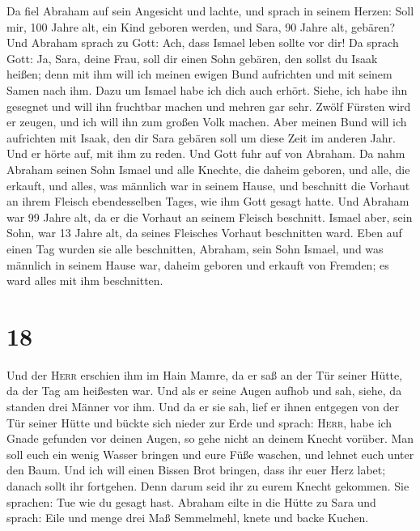  Da fiel Abraham auf sein Angesicht und lachte, und
sprach in seinem Herzen: Soll mir, 100 Jahre alt, ein Kind geboren
werden, und Sara, 90 Jahre alt, gebären?  Und Abraham
sprach zu Gott: Ach, dass Ismael leben sollte vor dir! 
Da sprach Gott: Ja, Sara, deine Frau, soll dir einen Sohn gebären, den
sollst du Isaak heißen; denn mit ihm will ich meinen ewigen Bund
aufrichten und mit seinem Samen nach ihm.  Dazu um Ismael
habe ich dich auch erhört. Siehe, ich habe ihn gesegnet und will ihn
fruchtbar machen und mehren gar sehr. Zwölf Fürsten wird er zeugen, und
ich will ihn zum großen Volk machen.  Aber meinen Bund
will ich aufrichten mit Isaak, den dir Sara gebären soll um diese Zeit
im anderen Jahr.  Und er hörte auf, mit ihm zu reden. Und
Gott fuhr auf von Abraham.  Da nahm Abraham seinen Sohn
Ismael und alle Knechte, die daheim geboren, und alle, die erkauft, und
alles, was männlich war in seinem Hause, und beschnitt die Vorhaut an
ihrem Fleisch ebendesselben Tages, wie ihm Gott gesagt hatte.
 Und Abraham war 99 Jahre alt, da er die Vorhaut an
seinem Fleisch beschnitt.  Ismael aber, sein Sohn, war 13
Jahre alt, da seines Fleisches Vorhaut beschnitten ward. 
Eben auf einen Tag wurden sie alle beschnitten, Abraham, sein Sohn
Ismael,  und was männlich in seinem Hause war, daheim
geboren und erkauft von Fremden; es ward alles mit ihm beschnitten.

\hypertarget{section-17}{%
\section{18}\label{section-17}}

 Und der \textsc{Herr} erschien ihm im Hain Mamre, da er
saß an der Tür seiner Hütte, da der Tag am heißesten war. 
Und als er seine Augen aufhob und sah, siehe, da standen drei Männer vor
ihm. Und da er sie sah, lief er ihnen entgegen von der Tür seiner Hütte
und bückte sich nieder zur Erde  und sprach:
\textsc{Herr}, habe ich Gnade gefunden vor deinen Augen, so gehe nicht
an deinem Knecht vorüber.  Man soll euch ein wenig Wasser
bringen und eure Füße waschen, und lehnet euch unter den Baum.
 Und ich will einen Bissen Brot bringen, dass ihr euer
Herz labet; danach sollt ihr fortgehen. Denn darum seid ihr zu eurem
Knecht gekommen. Sie sprachen: Tue wie du gesagt hast. 
Abraham eilte in die Hütte zu Sara und sprach: Eile und menge drei Maß
Semmelmehl, knete und backe Kuchen.

